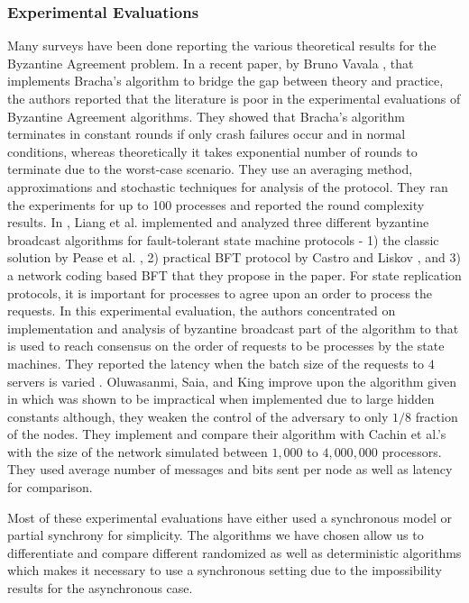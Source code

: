 \subsubsection{Experimental Evaluations}
Many surveys have been done reporting the various theoretical results for the Byzantine Agreement problem. In a recent paper, by Bruno Vavala \cite{VN12}, that implements Bracha's algorithm \cite{Bracha84} to bridge the gap between theory and practice, the authors reported that the literature is poor in the experimental evaluations of Byzantine Agreement algorithms. They showed that Bracha's algorithm terminates in constant rounds if only crash failures occur and in normal conditions, whereas theoretically it takes exponential number of rounds to terminate due to the worst-case scenario. They use an averaging method, approximations and stochastic techniques for analysis of the protocol. They ran the experiments for up to 100 processes and reported the round complexity results. In \cite{LSV12}, Liang et al. implemented and analyzed three different byzantine broadcast algorithms for fault-tolerant state machine protocols - 1) the classic solution by Pease et al. \cite{PeaseSL80}, 2) practical BFT protocol by Castro and Liskov \cite{CL02}, and 3) a network coding based BFT that they propose in the paper. For state replication protocols, it is important for processes to agree upon an order to process the requests. In this experimental evaluation, the authors concentrated on implementation and analysis of byzantine broadcast part of the algorithm to that is used to reach consensus on the order of requests to be processes by the state machines. They reported the latency when the batch size of the requests to $4$ servers is varied . Oluwasanmi, Saia, and King \cite{OSK10} improve upon the algorithm given in \cite{KS09} which was shown to be impractical when implemented due to large hidden constants although, they weaken the control of the adversary to only $1/8$ fraction of the nodes. They implement and compare their algorithm with Cachin et al.'s \cite{CKS05} with the size of the network simulated between $1,000$ to $4,000,000$ processors. They used average number of messages and bits sent per node as well as latency for comparison.

Most of these experimental evaluations have either used a synchronous model or partial synchrony for simplicity. The algorithms we have chosen allow us to differentiate and compare different randomized as well as deterministic algorithms which makes it necessary to use a synchronous setting due to the impossibility results for the asynchronous case. 

